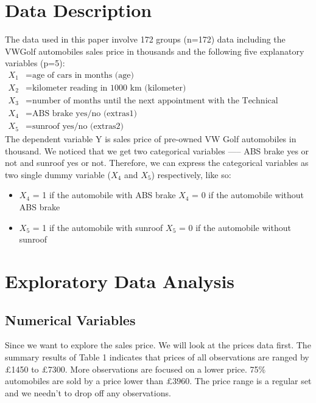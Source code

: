 \documentclass[a4paper]{article}
\begin{document}
\section{Data Description}
The data used in this paper involve 172 groups (n=172) data including the VWGolf automobiles sales price in thousands and the following five explanatory variables (p=5):
\begin{equation*}
\begin{aligned}
X_1 &= \text{age of cars in months (age) }\\[4pt]
X_2 &= \text{kilometer reading in 1000 km (kilometer)} \\[4pt]
X_3 &= \text{number of months until the next appointment with the Technical Inspection Agency (TIA)} \\[4pt]
X_4 &=\text{ABS brake yes/no (extras1)} \\[4pt]
X_5 &= \text{sunroof yes/no (extras2)}
\end{aligned}
\end{equation*}
The dependent variable Y is sales price of pre-owned VW Golf automobiles in thousand. We noticed that we get two categorical variables ----- ABS brake yes or not and sunroof yes or not. Therefore, we can express the categorical variables as two single dummy variable ($X_4$ and $X_5$) respectively, like so:
\begin{itemize}
    \item $X_4$ = 1 if the automobile with ABS brake \quad  \quad $X_4$ = 0 if the automobile without ABS brake
    \item $X_5$ = 1 if the automobile with sunroof \quad  \quad \quad $X_5$ = 0 if the automobile without sunroof
\end{itemize}





\section{Exploratory Data Analysis}


\subsection{Numerical Variables}
Since we want to explore the sales price. We will look at the prices data first. The summary results of Table 1 indicates that prices of all observations are ranged by $\pounds$1450 to $\pounds$7300. More observations are focused on a lower price. 75\% automobiles are sold by a price lower than $\pounds3960$. The price range is a regular set and we needn't to drop off any observations.\\   
\end{document}
